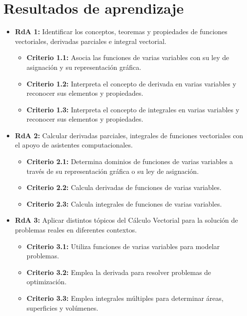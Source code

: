 \documentclass[a4,11pt]{aleph-notas}
\begin{document}
\addtolength{\headheight}{1.8\baselineskip}
\addtolength{\voffset}{-1.5\baselineskip}

\encabezado

\section{Resultados de aprendizaje} 

\begin{itemize}[leftmargin=*]
\item 
    \textbf{RdA 1:} Identificar los conceptos, teoremas y propiedades de funciones vectoriales, derivadas parciales e integral vectorial.
    \begin{itemize}[leftmargin=*]
        \item \textbf{Criterio 1.1:}  Asocia las funciones de varias variables con su ley de asignación y su representación gráfica.
        \item \textbf{Criterio 1.2:}  Interpreta el concepto de derivada en varias variables y reconocer sus elementos y propiedades.
        \item \textbf{Criterio 1.3:} Interpreta el concepto de integrales en varias variables y reconocer sus elementos y propiedades.
    \end{itemize}
\item 
    \textbf{RdA 2:} Calcular derivadas parciales, integrales de funciones vectoriales con el apoyo de asistentes computacionales.
    \begin{itemize}[leftmargin=*]
        \item \textbf{Criterio 2.1:}  Determina dominios de funciones de varias variables a través de su representación gráfica o su ley de asignación.
        \item \textbf{Criterio 2.2:} Calcula derivadas de funciones de varias variables.
        \item \textbf{Criterio 2.3:} Calcula integrales de funciones de varias variables.
    \end{itemize}
\item
    \textbf{RdA 3:} Aplicar distintos tópicos del Cálculo Vectorial para la solución de problemas reales en diferentes contextos.
    \begin{itemize}[leftmargin=*]
        \item \textbf{Criterio 3.1:} Utiliza funciones de varias variables para modelar problemas.
        \item \textbf{Criterio 3.2:} Emplea la derivada para resolver problemas de optimización.
        \item \textbf{Criterio 3.3:} Emplea integrales múltiples para determinar áreas, superficies y volúmenes.
    \end{itemize}
\end{itemize}
\end{document}
